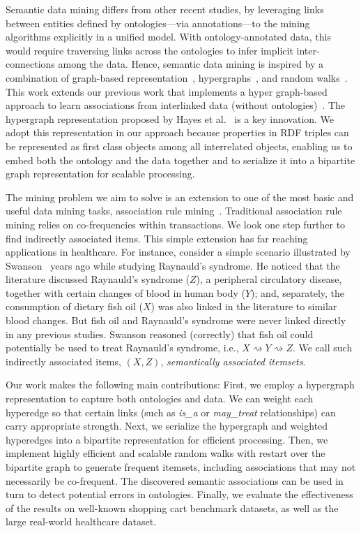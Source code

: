 Semantic data mining differs from other recent studies, by leveraging links between entities defined by ontologies---via annotations---to the mining algorithms explicitly in a unified model.  With ontology-annotated data, this would require traversing links across the ontologies to infer implicit inter-connections among the data. Hence, semantic data mining is inspired by a combination of graph-based representation~\cite{CheinMugnier08}, hypergraphs~\cite{Zhou06learningwith,Tian09}, and random walks~\cite{Fouss06random-walkcomputation,Pan,Yen05clusteringusing,Zhou:2009:GCB:1687627.1687709}. This work extends our previous work that implements a hyper graph-based approach to learn associations from interlinked data (without ontologies)~\cite{LiuEtal11}. The hypergraph representation proposed by Hayes et al.~\cite{GraphModelRDF} is a key innovation. We adopt this representation in our approach because properties in RDF triples can be represented as first class objects among all interrelated objects, enabling us to embed both the ontology and the data together and to serialize it into a bipartite graph representation for scalable processing.

The mining problem we aim to solve is an extension to one of the most basic and useful data mining tasks, association rule mining~\cite{Agrawal94}. Traditional association rule mining relies on co-frequencies within transactions. We look one step further to find indirectly associated items. This simple extension has far reaching applications in healthcare. For instance, consider a simple scenario illustrated by Swanson~\cite{swanson87} years ago while studying Raynauld's syndrome. He noticed that the literature discussed Raynauld's syndrome ($Z$), a peripheral circulatory disease, together with certain changes of blood in human body ($Y$); and, separately, the consumption of dietary fish oil ($X$) was also linked in the literature to similar blood changes.  But fish oil and Raynauld's syndrome were never linked directly in any previous studies.  Swanson reasoned (correctly) that fish oil could potentially be used to treat Raynauld's syndrome, i.e., $X\rightsquigarrow Y \rightsquigarrow Z$. We call such indirectly associated items, $(X,Z)$, \emph{semantically associated itemsets}. 

Our work makes the following main contributions:  First, we employ a hypergraph representation to capture both ontologies and data. We can weight each hyperedge so that certain links (such as \emph{is\_a} or \emph{may\_treat} relationships) can carry appropriate strength.  Next, we serialize the hypergraph and weighted hyperedges into a bipartite representation for efficient processing. Then, we implement highly efficient and scalable random walks with restart over the bipartite graph to generate frequent itemsets, including associations that may not necessarily be co-frequent. The discovered semantic associations can be used in turn to detect potential errors in ontologies. Finally, we evaluate the effectiveness of the results on well-known shopping cart benchmark datasets, as well as the large real-world healthcare dataset.

